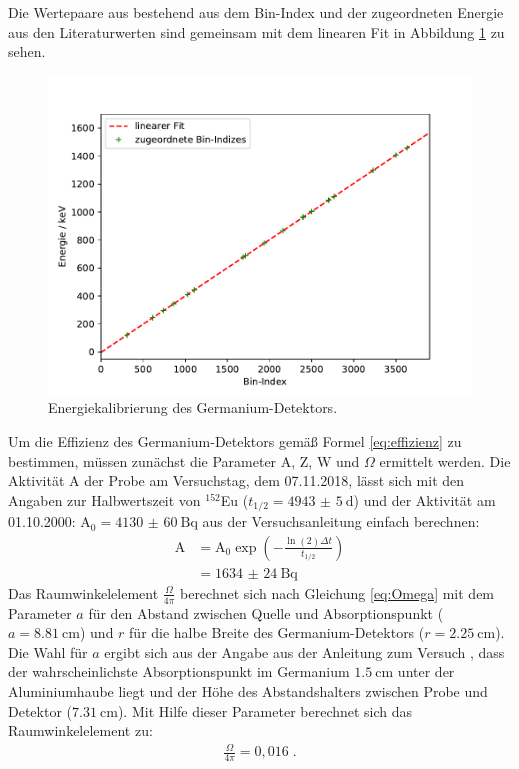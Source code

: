 \noindent Die Wertepaare aus bestehend aus dem Bin-Index und der zugeordneten Energie aus den Literaturwerten sind gemeinsam mit dem linearen Fit in Abbildung \ref{abb:linfit} zu sehen.

\FloatBarrier
\begin{figure}
    \centering
    \includegraphics[scale=0.7]{Kalibrierung.pdf}
    \caption{Energiekalibrierung des Germanium-Detektors.}
    \label{abb:linfit}
\end{figure}
\FloatBarrier

\noindent Um die Effizienz des Germanium-Detektors gemäß Formel \ref{eq:effizienz} zu bestimmen, müssen
zunächst die Parameter A, Z, W und $\Omega$ ermittelt werden.
Die Aktivität A der Probe am Versuchstag, dem 07.11.2018, lässt sich mit den Angaben zur Halbwertszeit von
$^{152}$Eu ($t_{1/2}=\SI{4943(5)}{\day}$) und der Aktivität am 01.10.2000: $\text{A}_0=
\SI{4130(60)}{\becquerel}$ aus der Versuchsanleitung \cite{Q1} einfach berechnen:
\begin{align*}
    \text{A} &= \text{A}_0 \exp \left(-\frac{\ln(2) \Delta t}{t_{1/2}}\right) \\
    &= \SI{1634(24)}{\becquerel}
\end{align*}
Das Raumwinkelelement $\frac{\Omega}{4 \pi}$ berechnet sich nach Gleichung \ref{eq:Omega} mit dem Parameter
$a$ für den Abstand zwischen Quelle und Absorptionspunkt ($a=\SI{8,81}{\centi\meter}$) und $r$ für die halbe
Breite des Germanium-Detektors ($r= \SI{2,25}{\centi \meter}$). Die Wahl für $a$ ergibt sich aus der Angabe
aus der Anleitung zum Versuch \cite{Q1}, dass der wahrscheinlichste Absorptionspunkt im Germanium
$\SI{1,5}{\centi \meter}$ unter der Aluminiumhaube liegt und der Höhe des Abstandshalters zwischen Probe und
Detektor ($\SI{7,31}{\centi \meter}$).
Mit Hilfe dieser Parameter berechnet sich das Raumwinkelelement zu:
\begin{align*}
    \frac{\Omega}{4 \pi} = 0,016 \; .
\end{align*}

